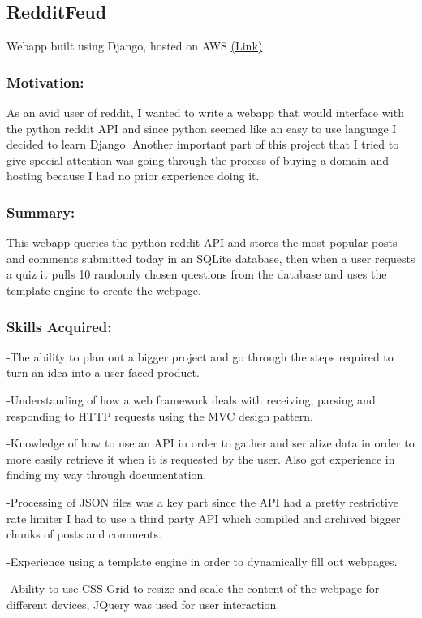 \documentclass[a4paper,hidelinks,12pt]{article}
\begin{document}
\subsection{RedditFeud}
Webapp built using Django, hosted on AWS \href{https:\\www.redditfeud.com}{(Link)}
\subsubsection{Motivation:}
As an avid user of reddit, I wanted to write a webapp that would interface with the python reddit API and
since python seemed like an easy to use language I decided to learn Django. Another important part of this
project that I tried to give special attention was going through the process of buying a domain and hosting
because I had no prior experience doing it.

\subsubsection{Summary:}
This webapp queries the python reddit API and stores the most popular posts and comments submitted today 
in an SQLite database, then when a user requests a quiz it pulls 10 randomly chosen questions from the
database and uses the template engine to create the webpage.
\subsubsection{Skills Acquired:}

-The ability to plan out a bigger project and go through the steps required to turn an idea into a user faced
product.

-Understanding of how a web framework deals with receiving, parsing and responding to HTTP requests using
the MVC design pattern.

-Knowledge of how to use an API in order to gather and serialize data in order to more easily retrieve it
when it is requested by the user. Also got experience in finding my way through documentation.

-Processing of JSON files was a key part since the API had a pretty restrictive rate limiter I had to use a
third party API which compiled and archived bigger chunks of posts and comments.

-Experience using a template engine in order to dynamically fill out webpages.

-Ability to use CSS Grid to resize and scale the content of the webpage for different devices, JQuery was used
for user interaction.
\end{document}
